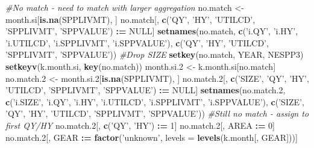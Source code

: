 \documentclass[]{article}
\newenvironment{Shaded}{\begin{snugshade}}{\end{snugshade}}
\newcommand{\KeywordTok}[1]{\textcolor[rgb]{0.13,0.29,0.53}{\textbf{#1}}}
\newcommand{\DataTypeTok}[1]{\textcolor[rgb]{0.13,0.29,0.53}{#1}}
\newcommand{\DecValTok}[1]{\textcolor[rgb]{0.00,0.00,0.81}{#1}}
\newcommand{\StringTok}[1]{\textcolor[rgb]{0.31,0.60,0.02}{#1}}
\newcommand{\CommentTok}[1]{\textcolor[rgb]{0.56,0.35,0.01}{\textit{#1}}}
\newcommand{\OtherTok}[1]{\textcolor[rgb]{0.56,0.35,0.01}{#1}}
\newcommand{\OperatorTok}[1]{\textcolor[rgb]{0.81,0.36,0.00}{\textbf{#1}}}
\newcommand{\ErrorTok}[1]{\textcolor[rgb]{0.64,0.00,0.00}{\textbf{#1}}}
\newcommand{\NormalTok}[1]{#1}
\begin{document}
\begin{Shaded}
\begin{Highlighting}[]
  \CommentTok{#No match - need to match with larger aggregation}
\NormalTok{  no.match  <-}\StringTok{ }\NormalTok{month.si[}\KeywordTok{is.na}\NormalTok{(SPPLIVMT), ]}
\NormalTok{  no.match[, }\KeywordTok{c}\NormalTok{(}\StringTok{'QY'}\NormalTok{, }\StringTok{'HY'}\NormalTok{, }\StringTok{'UTILCD'}\NormalTok{, }\StringTok{'SPPLIVMT'}\NormalTok{, }\StringTok{'SPPVALUE'}\NormalTok{) }\OperatorTok{:}\ErrorTok{=}\StringTok{ }\OtherTok{NULL}\NormalTok{]}
  \KeywordTok{setnames}\NormalTok{(no.match, }\KeywordTok{c}\NormalTok{(}\StringTok{'i.QY'}\NormalTok{, }\StringTok{'i.HY'}\NormalTok{, }\StringTok{'i.UTILCD'}\NormalTok{, }\StringTok{'i.SPPLIVMT'}\NormalTok{, }\StringTok{'i.SPPVALUE'}\NormalTok{), }
           \KeywordTok{c}\NormalTok{(}\StringTok{'QY'}\NormalTok{, }\StringTok{'HY'}\NormalTok{, }\StringTok{'UTILCD'}\NormalTok{, }\StringTok{'SPPLIVMT'}\NormalTok{, }\StringTok{'SPPVALUE'}\NormalTok{))}
  \CommentTok{#Drop SIZE}
  \KeywordTok{setkey}\NormalTok{(no.match, YEAR, NESPP3)}
  \KeywordTok{setkeyv}\NormalTok{(k.month.si, }\KeywordTok{key}\NormalTok{(no.match))}
\NormalTok{  month.si.}\DecValTok{2}\NormalTok{ <-}\StringTok{ }\NormalTok{k.month.si[no.match]}
\NormalTok{  no.match.}\DecValTok{2}\NormalTok{ <-}\StringTok{ }\NormalTok{month.si.}\DecValTok{2}\NormalTok{[}\KeywordTok{is.na}\NormalTok{(SPPLIVMT), ]}
\NormalTok{  no.match.}\DecValTok{2}\NormalTok{[, }\KeywordTok{c}\NormalTok{(}\StringTok{'SIZE'}\NormalTok{, }\StringTok{'QY'}\NormalTok{, }\StringTok{'HY'}\NormalTok{, }\StringTok{'UTILCD'}\NormalTok{, }\StringTok{'SPPLIVMT'}\NormalTok{, }\StringTok{'SPPVALUE'}\NormalTok{) }\OperatorTok{:}\ErrorTok{=}\StringTok{ }\OtherTok{NULL}\NormalTok{]}
  \KeywordTok{setnames}\NormalTok{(no.match.}\DecValTok{2}\NormalTok{, }\KeywordTok{c}\NormalTok{(}\StringTok{'i.SIZE'}\NormalTok{, }\StringTok{'i.QY'}\NormalTok{, }\StringTok{'i.HY'}\NormalTok{, }\StringTok{'i.UTILCD'}\NormalTok{, }\StringTok{'i.SPPLIVMT'}\NormalTok{, }\StringTok{'i.SPPVALUE'}\NormalTok{), }
           \KeywordTok{c}\NormalTok{(}\StringTok{'SIZE'}\NormalTok{, }\StringTok{'QY'}\NormalTok{, }\StringTok{'HY'}\NormalTok{, }\StringTok{'UTILCD'}\NormalTok{, }\StringTok{'SPPLIVMT'}\NormalTok{, }\StringTok{'SPPVALUE'}\NormalTok{))}
  \CommentTok{#Still no match - assign to first QY/HY}
\NormalTok{  no.match.}\DecValTok{2}\NormalTok{[, }\KeywordTok{c}\NormalTok{(}\StringTok{'QY'}\NormalTok{, }\StringTok{'HY'}\NormalTok{) }\OperatorTok{:}\ErrorTok{=}\StringTok{ }\DecValTok{1}\NormalTok{]}
\NormalTok{  no.match.}\DecValTok{2}\NormalTok{[, AREA }\OperatorTok{:}\ErrorTok{=}\StringTok{ }\DecValTok{0}\NormalTok{]}
\NormalTok{  no.match.}\DecValTok{2}\NormalTok{[, GEAR }\OperatorTok{:}\ErrorTok{=}\StringTok{ }\KeywordTok{factor}\NormalTok{(}\StringTok{'unknown'}\NormalTok{, }\DataTypeTok{levels =} \KeywordTok{levels}\NormalTok{(k.month[, GEAR]))]}
  

\end{Highlighting}
\end{Shaded}
\end{document}
